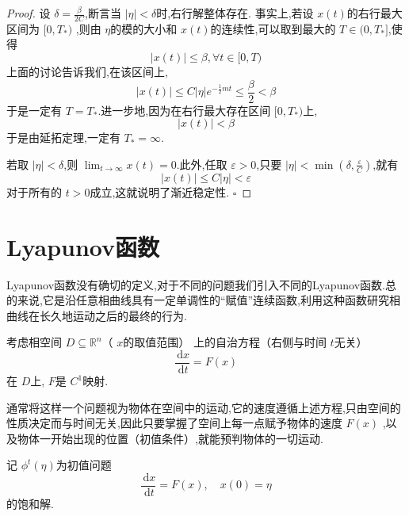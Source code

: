 \documentclass[lang=cn,12pt,color=green,fontset=none]{elegantbook}
\begin{document}
\begin{proof}
    设 $ \delta = \frac{\beta}{2C} $,断言当 $ \left| \eta  \right|< \delta   $时,右行解整体存在.
    事实上,若设 $ x\left( t \right)  $的右行最大区间为 $ [0,T_{*}) $  ,则由 $ \eta  $的模的大小和 $ x\left( t \right) $的连续性,可以取到最大的 $ T \in (0,T_{*}]  $,使得   $$
     \left| x\left( t \right)  \right| \le \beta  ,\forall t\in [0,T) 
    $$上面的讨论告诉我们,在该区间上,$$
    \left| x\left( t \right)  \right| \le  C\left| \eta  \right|e^{-\frac{1}{2}mt}\le  \frac{\beta}{2}< \beta  
    $$于是一定有 $ T = T_{*} $.进一步地,因为在右行最大存在区间 $ [0,T_{*}) $上, $$
    \left| x\left( t \right)  \right| <\beta 
    $$  于是由延拓定理,一定有 $ T_{*}=\infty $. 
    
    若取 $ \left| \eta  \right|< \delta   $,则 $ \lim_{t \to \infty}x\left( t \right)=0  $.此外,任取 $ \varepsilon >0 $,只要 $ \left| \eta  \right|< \min \left( \delta , \frac{\varepsilon}{C} \right)   $,就有 $$
    \left| x\left( t \right)  \right|   \le C\left| \eta  \right| <\varepsilon   
    $$    对于所有的 $ t>0 $成立,这就说明了渐近稳定性. 
    \hfill $\square$
\end{proof}

\section{Lyapunov函数}

Lyapunov函数没有确切的定义,对于不同的问题我们引入不同的Lyapunov函数.总的来说,它是沿任意相曲线具有一定单调性的“赋值”连续函数,利用这种函数研究相曲线在长久地运动之后的最终的行为.


考虑相空间 $ D\subseteq \mathbb{R} ^{n} $（ $ x $的取值范围） 上的自治方程（右侧与时间 $ t $无关）   $$
 \frac{\,\mathrm{d} x }{ \,\mathrm{d} t} =F\left( x \right)  
$$在 $ D $上, $ F $是 $ C^{1} $映射.
\begin{note}
    通常将这样一个问题视为物体在空间中的运动,它的速度遵循上述方程,只由空间的性质决定而与时间无关,因此只要掌握了空间上每一点赋予物体的速度 $ F\left( x \right)  $ ,以及物体一开始出现的位置（初值条件）,就能预判物体的一切运动.
   
    
\end{note}

\begin{definition}
    记 $ \phi ^{t}\left( \eta  \right)  $为初值问题 $$
    \frac{\,\mathrm{d} x }{\,\mathrm{d} t } = F\left( x \right),\quad  x\left( 0 \right)   = \eta 
    $$ 的饱和解.
\end{definition}
\end{document}
